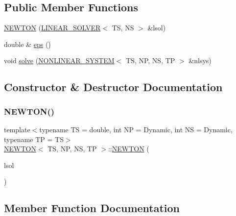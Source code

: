 \subsection*{Public Member Functions}
\begin{DoxyCompactItemize}
\item 
\mbox{\hyperlink{class_n_e_w_t_o_n_a473d598fe7f30d8895a90a7daecb5f01}{N\+E\+W\+T\+ON}} (\mbox{\hyperlink{class_l_i_n_e_a_r___s_o_l_v_e_r}{L\+I\+N\+E\+A\+R\+\_\+\+S\+O\+L\+V\+ER}}$<$ TS, NS $>$ \&lsol)
\item 
double \& \mbox{\hyperlink{class_n_e_w_t_o_n_a222247d7695d9cce96f424a49d5ad2f6}{eps}} ()
\item 
void \mbox{\hyperlink{class_n_e_w_t_o_n_a1dd31b882567d3e0427eb53ce169f0ce}{solve}} (\mbox{\hyperlink{class_n_o_n_l_i_n_e_a_r___s_y_s_t_e_m}{N\+O\+N\+L\+I\+N\+E\+A\+R\+\_\+\+S\+Y\+S\+T\+EM}}$<$ TS, NP, NS, TP $>$ \&nlsys)
\end{DoxyCompactItemize}


\subsection{Constructor \& Destructor Documentation}
\mbox{\label{class_n_e_w_t_o_n_a473d598fe7f30d8895a90a7daecb5f01}} 
\subsubsection{\texorpdfstring{N\+E\+W\+T\+O\+N()}{NEWTON()}}
{\footnotesize\ttfamily template$<$typename TS = double, int NP = Dynamic, int NS = Dynamic, typename TP = TS$>$ \\
\mbox{\hyperlink{class_n_e_w_t_o_n}{N\+E\+W\+T\+ON}}$<$ TS, NP, NS, TP $>$\+::\mbox{\hyperlink{class_n_e_w_t_o_n}{N\+E\+W\+T\+ON}} (\begin{DoxyParamCaption}\item[{\mbox{\hyperlink{class_l_i_n_e_a_r___s_o_l_v_e_r}{L\+I\+N\+E\+A\+R\+\_\+\+S\+O\+L\+V\+ER}}$<$ TS, NS $>$ \&}]{lsol }\end{DoxyParamCaption})\hspace{0.3cm}{\ttfamily [inline]}}



\subsection{Member Function Documentation}
\mbox{\label{class_n_e_w_t_o_n_a222247d7695d9cce96f424a49d5ad2f6}} 
